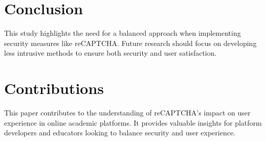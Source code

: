 \documentclass{article}
\begin{document}
\section{Conclusion}
This study highlights the need for a balanced approach when implementing security measures like reCAPTCHA. Future research should focus on developing less intrusive methods to ensure both security and user satisfaction.

\section{Contributions}
This paper contributes to the understanding of reCAPTCHA's impact on user experience in online academic platforms. It provides valuable insights for platform developers and educators looking to balance security and user experience.



\end{document}

